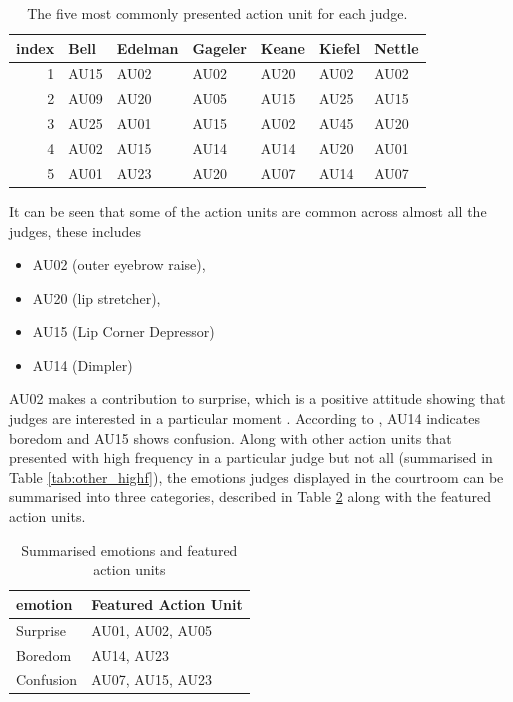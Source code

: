\documentclass{monashthesis}
\begin{document}
\begin{table}[t]

\caption{\label{tab:unnamed-chunk-5}\label{tab:most_common}The five most commonly presented action unit for each judge.}
\centering
\begin{tabular}{r|l|l|l|l|l|l}
\hline
index & Bell & Edelman & Gageler & Keane & Kiefel & Nettle\\
\hline
1 & AU15 & AU02 & AU02 & AU20 & AU02 & AU02\\
\hline
2 & AU09 & AU20 & AU05 & AU15 & AU25 & AU15\\
\hline
3 & AU25 & AU01 & AU15 & AU02 & AU45 & AU20\\
\hline
4 & AU02 & AU15 & AU14 & AU14 & AU20 & AU01\\
\hline
5 & AU01 & AU23 & AU20 & AU07 & AU14 & AU07\\
\hline
\end{tabular}
\end{table}

It can be seen that some of the action units are common across almost all the judges, these includes

\begin{itemize}
\tightlist
\item
  AU02 (outer eyebrow raise),
\item
  AU20 (lip stretcher),
\item
  AU15 (Lip Corner Depressor)
\item
  AU14 (Dimpler)
\end{itemize}

AU02 makes a contribution to surprise, which is a positive attitude showing that judges are interested in a particular moment \autocite{ekman2002facial}. According to \autocite{ekman2002facial}, AU14 indicates boredom and AU15 shows confusion. Along with other action units that presented with high frequency in a particular judge but not all (summarised in Table \ref{tab:other_highf}), the emotions judges displayed in the courtroom can be summarised into three categories, described in Table \ref{tab:three_category} along with the featured action units.

\begin{table}[t]

\caption{\label{tab:unnamed-chunk-6}\label{tab:three_category} Summarised emotions and featured action units}
\centering
\begin{tabular}{l|l}
\hline
emotion & Featured Action Unit\\
\hline
Surprise & AU01, AU02, AU05\\
\hline
Boredom & AU14, AU23\\
\hline
Confusion & AU07, AU15, AU23\\
\hline
\end{tabular}
\end{table}
\end{document}
